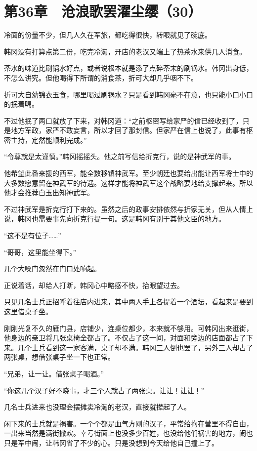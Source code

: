 \section{第36章　沧浪歌罢濯尘缨（30）}

冷面的份量不少，但几人久在军旅，都吃得很快，转眼就见了碗底。

韩冈没有打算点第二份，吃完冷淘，开店的老汉又端上了热茶水来供几人消食。

茶水的味道比刷锅水好点，或者说根本就是添了点碎茶末的刷锅水。韩冈出身低，不怎么讲究。但他喝得下所谓的消食茶，折可大却几乎咽不下。

折可大自幼锦衣玉食，哪里喝过刷锅水？只是看到韩冈毫不在意，也只能小口小口的抿着喝。

不过他抿了两口就放了下来，对韩冈道：“之前枢密写给家严的信已经收到了，只是地方军政，家严不敢妄言，所以才回了那封信。但家严在信上也说了，此事有枢密主持，定然能顺利完成。”

“令尊就是太谨慎。”韩冈摇摇头。他之前写信给折克行，说的是神武军的事。

他希望此番来援的西军，能全数移镇神武军。至少朝廷也要给出能让西军将士中的大多数愿意留在神武军的待遇。这样才能将神武军这个战略要地给支撑起来。所以他才会推荐白玉出知神武军。

不过神武军是折克行打下来的。虽然之后的政事安排依然与折家无关，但从人情上说，韩冈也需要事先向折克行提一句。这是韩冈有别于其他文臣的地方。

“这不是有位子……”

“哥哥，这里能坐得下。”

几个大嗓门忽然在门口处响起。

正说着话，却给人打断，韩冈心中略感不快，抬眼望过去。

只见几名士兵正招呼着往店内进来，其中两人手上各提着一个酒坛，看起来是要到这里借桌子坐。

刚刚光复不久的雁门县，店铺少，连桌位都少，本来就不够用。可韩冈出来逛街，他身边的亲卫将几张桌椅全都占了。不仅占了这一间，对面和旁边的店面都占了下来。几个士兵看到这一家客满，桌子却不满。韩冈三人倒也罢了，另外三人却占了两张桌，想借张桌子坐一下也正常。

“兄弟，让一让。借张桌子喝酒。”

“你这几个汉子好不晓事，才三个人就占了两张桌。让让！让让！”

几名士兵进来也没理会摆摊卖冷淘的老汉，直接就撵起了人。

闲下来的士兵就是祸害。一个个都是血气方刚的汉子，平常给拘在营里不得自由，一出来当然是满街撒欢。幸亏街面上也没多少百姓，也没给他们祸害的地方，闹也只是军中闹，让韩冈省了不少的心。只是没想到今天给他自己撞上了。

